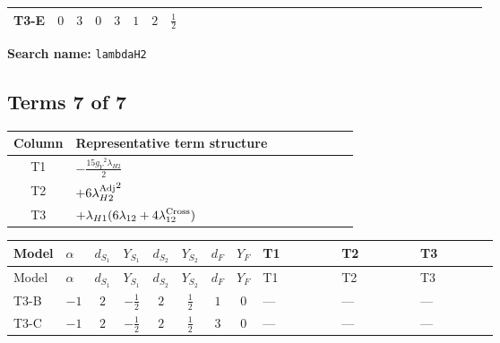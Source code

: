 \documentclass[8pt]{article}
\begin{document}
\begin{landscape}
\begin{longtable}{@{}llcccccc >{\raggedright\arraybackslash}p{0.21\linewidth} >{\raggedright\arraybackslash}p{0.21\linewidth} >{\raggedright\arraybackslash}p{0.21\linewidth}@{}}
\midrule
T3-E & $0$ & $3$ & $0$ & $3$ & $1$ & $2$ & $\frac{1}{2}$ & \scriptsize\adjustbox{max width=\linewidth}{$\begin{gathered} +6 {g_2}^4\end{gathered}$} & \scriptsize\adjustbox{max width=\linewidth}{$\begin{gathered} -\frac{33 {g_2}^2 {\lambda_{H2}}}{2}\end{gathered}$} & \scriptsize\adjustbox{max width=\linewidth}{$\begin{gathered} +3 {g_Y}^4\end{gathered}$} \\
\midrule
\bottomrule
\end{longtable}
\clearpage
\noindent\textbf{Search name: }\texttt{lambdaH2}\par\smallskip
\subsection*{Terms 7 of 7}
\begin{center}
\begin{tabular}{@{}c >{\raggedright\arraybackslash}p{0.82\linewidth}@{}}
\toprule
Column & Representative term structure \\
\midrule
T1 & \(\displaystyle -\frac{15 {g_Y}^2 {\lambda_{H2}}}{2}\) \\
\midrule
T2 & \(\displaystyle +6 {\lambda_{H2}^{\rm Adj}}^2\) \\
\midrule
T3 & \(\displaystyle +{\lambda_{H1}} (6 {\lambda_{12}}+4 {\lambda_{12}^{\rm Cross}})\) \\
\midrule
\bottomrule
\end{tabular}
\end{center}
\smallskip
\tiny
\begin{longtable}{@{}llcccccc >{\raggedright\arraybackslash}p{0.21\linewidth} >{\raggedright\arraybackslash}p{0.21\linewidth} >{\raggedright\arraybackslash}p{0.21\linewidth}@{}}
\toprule
Model & $\alpha$ & $d_{S_1}$ & $Y_{S_1}$ & $d_{S_2}$ & $Y_{S_2}$ & $d_F$ & $Y_F$ & T1 & T2 & T3 \\
\midrule
\endfirsthead
\toprule
Model & $\alpha$ & $d_{S_1}$ & $Y_{S_1}$ & $d_{S_2}$ & $Y_{S_2}$ & $d_F$ & $Y_F$ & T1 & T2 & T3 \\
\midrule
\endhead
T3-B & $-1$ & $2$ & $-\frac{1}{2}$ & $2$ & $\frac{1}{2}$ & $1$ & $0$ & --- & --- & --- \\
\midrule
T3-C & $-1$ & $2$ & $-\frac{1}{2}$ & $2$ & $\frac{1}{2}$ & $3$ & $0$ & --- & --- & --- \\

\end{longtable}
\end{landscape}
\end{document}
